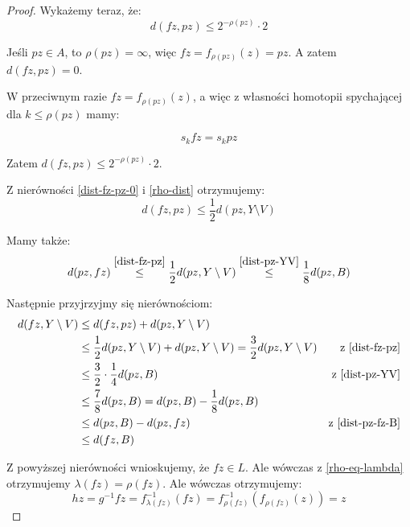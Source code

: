 \begin{lem}
\begin{proof}
    Wykażemy teraz, że:
    \begin{equation}
      \label{dist-fz-pz-0}d(fz, pz) \leq 2^{-\rho(pz)} \cdot 2
    \end{equation}
    
    Jeśli $pz \in A$, to $\rho(pz) = \infty$, więc $fz = f_{\rho(pz)}(z) = pz$. A zatem $d(fz, pz) = 0$.
    
    W przeciwnym razie $fz = f_{\rho(pz)}(z)$, a więc z własności homotopii spychającej dla $k \leq \rho(pz)$ mamy:
    
    \[s_k fz = s_k pz\]
    
    Zatem $d(fz, pz) \leq 2^{-\rho(pz)} \cdot 2$.
    
    Z nierówności \eqref{dist-fz-pz-0} i \eqref{rho-dist} otrzymujemy:
    \begin{equation}
      \label{dist-fz-pz} d(fz, pz) \leq \frac{1}{2} d(pz, Y \setminus V)
    \end{equation}
    
    Mamy także:
    \begin{equation}
      \label{dist-pz-fz-B} d(pz, fz) \overset{\eqref{dist-fz-pz}}{\leq} \frac{1}{2} d(pz, Y \setminus V) \overset{\eqref{dist-pz-YV}}{\leq} \frac{1}{8} d(pz, B)
    \end{equation}


    Następnie przyjrzyjmy się nierównościom:
    \begin{align*}
      d(fz, Y \setminus V) & \leq d(fz, pz) + d(pz, Y \setminus V) \\
      & \leq \frac{1}{2} d(pz, Y \setminus V) + d(pz, Y \setminus V) = \frac{3}{2} d(pz, Y \setminus V) & \mbox{z \eqref{dist-fz-pz}} \\
      & \leq \frac{3}{2} \cdot \frac{1}{4} d(pz, B) & \mbox{z \eqref{dist-pz-YV}} \\
      & \leq \frac{7}{8} d(pz, B) = d(pz, B) - \frac{1}{8} d(pz, B) \\
      & \leq d(pz, B) - d(pz, fz) & \mbox{z \eqref{dist-pz-fz-B}} \\
      & \leq d(fz, B)
    \end{align*}
    
    Z powyższej nierówności wnioskujemy, że $fz \in L$. Ale wówczas z \eqref{rho-eq-lambda} otrzymujemy $\lambda(fz) = \rho(fz)$. Ale wówczas otrzymujemy:
    \[hz = g^{-1}fz = f^{-1}_{\lambda(fz)}(fz) = f^{-1}_{\rho(fz)}(f_{\rho(fz)}(z)) = z\]
  \end{proof}

\end{lem}
